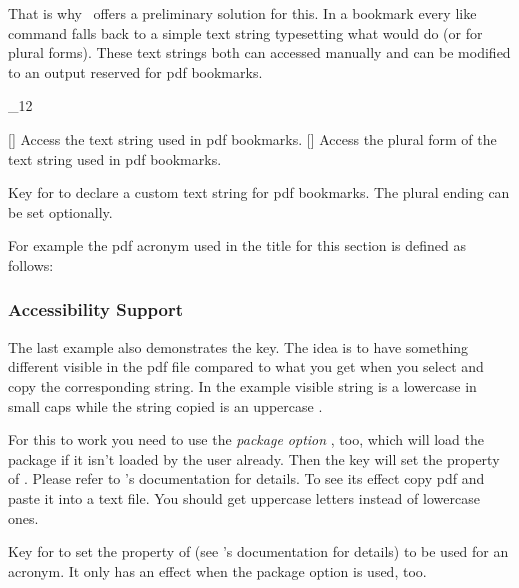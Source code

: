 \documentclass[load-preamble+]{cnltx-doc}
\makeatletter
\renewenvironment{commands}
  {%
    \cnltx@set@catcode_{12}%
    \let\command\cnltx@command
    \cnltxlist
  }
  {\endcnltxlist}
\makeatother
\begin{document}
That is why \acro\ offers a preliminary solution for this.  In a bookmark
every  like command falls back to a simple text string typesetting what
 would do (or  for plural forms).  These text strings both
can accessed manually and can be modified to an output reserved for \acs{pdf}
bookmarks.

\begin{commands}
  \command{acpdfstring}[]
    Access the text string used in \acs{pdf} bookmarks.
  \command{acpdfstringplural}[]
    Access the plural form of the text string used in \acs{pdf} bookmarks.
\end{commands}
\begin{options}
    Key for  to declare a custom text string for \acs{pdf}
    bookmarks.  The plural ending can be set optionally.
\end{options}

For example the \acs{pdf} acronym used in the title for this section is defined
as follows:
\begin{sourcecode}
\end{sourcecode}

\subsubsection{Accessibility Support}

The last example also demonstrates the  key.  The idea is to
have something different visible in the \acs{pdf} file compared to what you
get when you select and copy the corresponding string.  In the example visible
string is a lowercase  in small caps while the string copied is an
uppercase .

For this to work you need to use the \emph{package option} ,
too, which will load the package  if it isn't loaded by the user
already.  Then the key  will set the 
property of .  Please refer to 's documentation
for details.  To see its effect copy \ac{pdf} and paste it into a text file.
You should get uppercase letters instead of lowercase ones.

\begin{options}
    Key for  to set the  property of
     (see 's documentation for details) to be
    used for an acronym.  It only has an effect when the package option
     is used, too.
\end{options}
\end{document}
